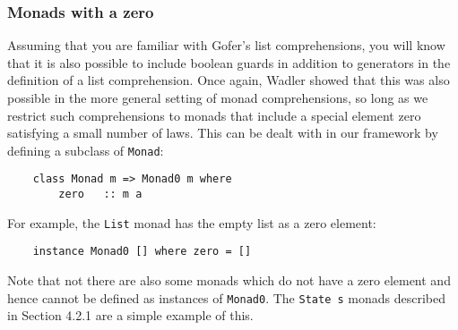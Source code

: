 \subsubsection{Monads with a zero}
Assuming that you are familiar with Gofer's list comprehensions, you
will know that it is also possible to include boolean guards in
addition to generators in the definition of a list comprehension.  Once
again, Wadler showed that this was also possible in the more general
setting of monad comprehensions, so long as we restrict such
comprehensions to monads that include a special element zero satisfying
a small number of laws.  This can be dealt with in our framework by
defining a subclass of \verb"Monad":
\begin{verbatim}
    class Monad m => Monad0 m where
        zero   :: m a
\end{verbatim}
For example, the \verb"List" monad has the empty list as a zero element:
\begin{verbatim}
    instance Monad0 [] where zero = []
\end{verbatim}
Note that not there are also some monads which do not have a zero
element and hence cannot be defined as instances of \verb"Monad0".  The
\verb"State s" monads described in Section 4.2.1 are a simple example of
this.

